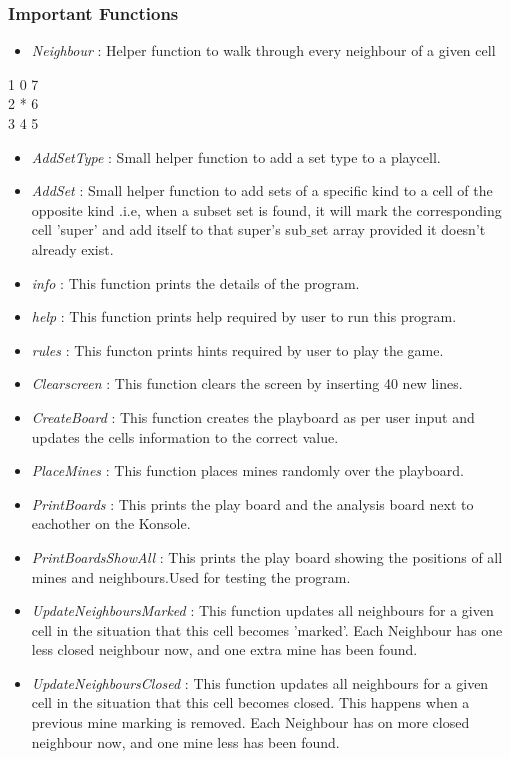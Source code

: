 \documentclass[12pt,a4paper]{report}
\begin{document}
\subsubsection*{Important Functions} 
\begin{itemize}
\item[]\textit{Neighbour} : Helper function to walk through every neighbour of a given cell
\end{itemize}
      1 0 7\\
      2 * 6\\
      3 4 5\\
\begin{itemize}
\item[]\textit{AddSetType} : Small helper function to add a set type to a playcell.
\item[]\textit{AddSet} : Small helper function to add sets of a specific kind to a cell of the opposite kind .i.e, when a subset set is found, it will mark the corresponding cell 'super' and add itself to that super's sub$\_$set array provided it doesn't already exist.
\item[]\textit{info} : This function prints the details of the program.
\item[]\textit{help} : This function prints help required by user to run this program.
\item[]\textit{rules} : This functon prints hints required by user to play the game.
\item[]\textit{Clearscreen} : This function clears the screen by inserting 40 new lines.
\item[]\textit{CreateBoard} : This function creates the playboard as per user input and updates the cells information to the correct value.
\item[]\textit{PlaceMines} : This function places mines randomly over the playboard.
\item[]\textit{PrintBoards} : This prints the play board and the analysis board next to eachother on the Konsole. 
\item[]\textit{PrintBoardsShowAll} : This prints the play board showing the positions of all mines and neighbours.Used for testing the program.
\item[]\textit{UpdateNeighboursMarked} : This function updates all neighbours for a given cell in the situation that this cell becomes 'marked'. Each Neighbour has one less closed neighbour now, and one extra mine has been found.
\item[]\textit{UpdateNeighboursClosed} : This function updates all neighbours for a given cell in the situation that this cell becomes closed. This happens when a previous mine marking is removed. Each Neighbour has on more closed neighbour now, and one mine less has been found.

\end{itemize}
\end{document}
